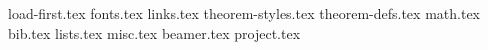 
{load-first.tex}
{fonts.tex}
{links.tex}
{theorem-styles.tex}
{theorem-defs.tex}
{math.tex}
{bib.tex}
{lists.tex}
{misc.tex}
{beamer.tex}
{project.tex}
